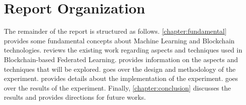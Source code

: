 \section{Report Organization}

The remainder of the report is structured as follows. \cref{chapter:fundamental} provides some fundamental concepts about Machine Learning and Blockchain technologies.  reviews the existing work regarding aspects and techniques used in Blockchain-based Federated Learning.  provides information on the aspects and techniques that will be explored.  goes over the design and methodology of the experiment.  provides details about the implementation of the experiment.  goes over the results of the experiment. Finally, \cref{chapter:conclusion} discusses the results and provides directions for future works.

